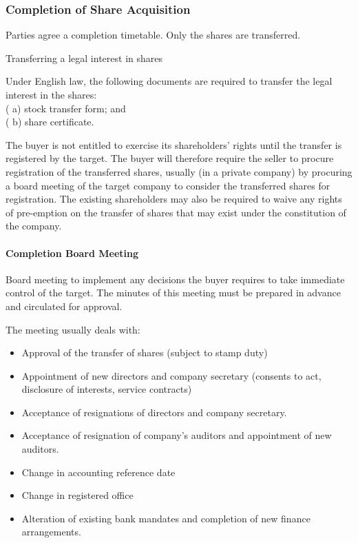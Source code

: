 \documentclass[
]{article}
\providecommand{\tightlist}{%
  \setlength{\itemsep}{0pt}\setlength{\parskip}{0pt}}
\newenvironment{env-48e9bfc8-c3dd-4504-a5fa-3b34b9a27ccf}
{
    \savenotes\tcolorbox[blanker,breakable,left=5pt,borderline west={2pt}{-4pt}{blue}]
}
{
    \endtcolorbox\spewnotes
}
\begin{document}
\hypertarget{completion-of-share-acquisition}{%
\subsubsection{Completion of Share
Acquisition}\label{completion-of-share-acquisition}}

Parties agree a completion timetable. Only the shares are transferred.

\begin{env-48e9bfc8-c3dd-4504-a5fa-3b34b9a27ccf}

Transferring a legal interest in shares

Under English law, the following documents are required to transfer the
legal interest in the shares:\\
( a) stock transfer form; and\\
( b) share certificate.

\end{env-48e9bfc8-c3dd-4504-a5fa-3b34b9a27ccf}

The buyer is not entitled to exercise its shareholders' rights until the
transfer is registered by the target. The buyer will therefore require
the seller to procure registration of the transferred shares, usually
(in a private company) by procuring a board meeting of the target
company to consider the transferred shares for registration. The
existing shareholders may also be required to waive any rights of
pre-emption on the transfer of shares that may exist under the
constitution of the company.

\hypertarget{completion-board-meeting}{%
\paragraph{Completion Board Meeting}\label{completion-board-meeting}}

Board meeting to implement any decisions the buyer requires to take
immediate control of the target. The minutes of this meeting must be
prepared in advance and circulated for approval.

The meeting usually deals with:

\begin{itemize}
\tightlist
\item
  Approval of the transfer of shares (subject to stamp duty)
\item
  Appointment of new directors and company secretary (consents to act,
  disclosure of interests, service contracts)
\item
  Acceptance of resignations of directors and company secretary.
\item
  Acceptance of resignation of company's auditors and appointment of new
  auditors.
\item
  Change in accounting reference date
\item
  Change in registered office
\item
  Alteration of existing bank mandates and completion of new finance
  arrangements.
\end{itemize}
\end{document}
